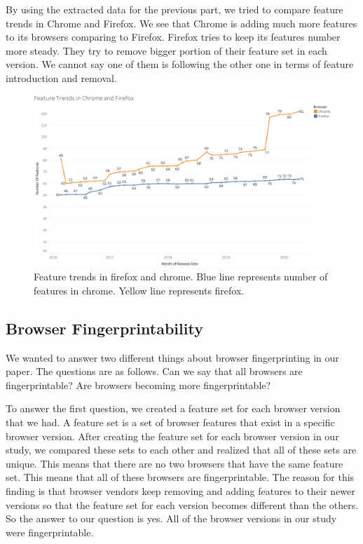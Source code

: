 By using the extracted data for the previous part, we tried to compare feature trends in Chrome and Firefox. We see that Chrome is adding much more features to its browsers comparing to Firefox. Firefox tries to keep its features number more steady. They try to remove bigger portion of their feature set in each version. We cannot say one of them is following the other one in terms of feature introduction and removal.

\begin{figure}[ht]
    \centering
    \includegraphics[width=\columnwidth]{figures/Feature-Trends.PNG}
    \caption{Feature trends in firefox and chrome. Blue line represents number of features in chrome. Yellow line represents firefox.}
    \label{fig:times_bar}
\end{figure}



\subsection{Browser Fingerprintability}
We wanted to answer two different things about browser fingerprinting in our paper. The questions are as follows. Can we say that all browsers are fingerprintable? Are browsers becoming more fingerprintable?

To answer the first question, we created a feature set for each browser version that we had. A feature set is a set of browser features that exist in a specific browser version. After creating the feature set for each browser version in our study, we compared these sets to each other and realized that all of these sets are unique. This means that there are no two browsers that have the same feature set. This means that all of these browsers are fingerprintable. The reason for this finding is that browser vendors keep removing and adding features to their newer versions so that the feature set for each version becomes different than the others. So the answer to our question is yes. All of the browser versions in our study were fingerprintable.


